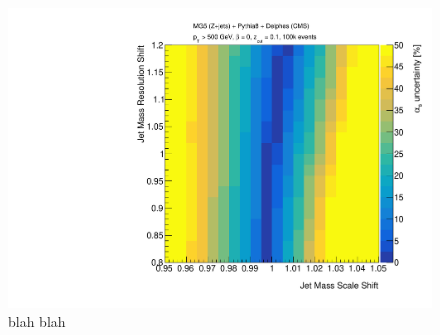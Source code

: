 \begin{figure}[h!]
\begin{center}
\includegraphics[width = 0.49\columnwidth]{figures/experimentaldemo/resolution_scan.pdf}
\end{center}
\caption{blah blah}
\label{fig:expfit}
\end{figure}

